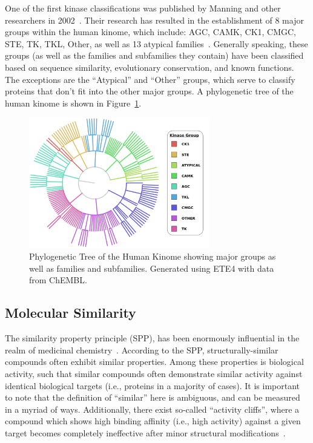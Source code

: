 \documentclass[11pt]{article}
\begin{document}
One of the first kinase classifications was published by Manning and other researchers in 2002~\cite{manning_2002}. 
Their research has resulted in the establishment of 8 major groups within the human kinome, which include: AGC, CAMK, CK1, CMGC, STE, TK, TKL, Other, as well as 13 atypical families~\cite{eid_turk_volkamer_rippmann_fulle_2017}.
Generally speaking, these groups (as well as the families and subfamilies they contain) have been classified based on sequence similarity, evolutionary conservation, and known functions. The exceptions are the ``Atypical'' and ``Other'' groups, which serve to classify proteins that don't fit into the other major groups. 
A phylogenetic tree of the human kinome is shown in Figure~\ref{fig:fam_tree}. %

\begin{figure}[H]
    \centering
    \includegraphics[width=0.7\textwidth]{../figures/protein_family_tree.png}
    \caption{Phylogenetic Tree of the Human Kinome showing major groups as well as families and subfamilies. Generated using ETE4 with data from ChEMBL.}
    \label{fig:fam_tree}
\end{figure}


\subsection*{Molecular Similarity}
The similarity property principle (SPP), has been enormously influential in the realm of medicinal chemistry~\cite{maggiora_vogt_stumpfe_bajorath_2013}. 
According to the SPP, structurally-similar compounds often exhibit similar properties. 
Among these properties is biological activity, such that similar compounds often demonstrate similar activity against identical biological targets (i.e., proteins in a majority of cases). 
It is important to note that the definition of ``similar'' here is ambiguous, and can be measured in a myriad of ways. 
Additionally, there exist so-called ``activity cliffs'', where a compound which shows high binding affinity (i.e., high activity) against a given target becomes completely ineffective after minor structural modifications~\cite{maggiora_vogt_stumpfe_bajorath_2013,filip_miljkovic_jurgen_bajorath_2018}. 
\end{document}
